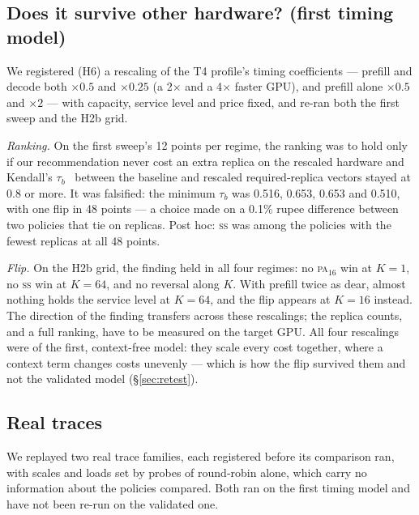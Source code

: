 \documentclass[10pt,twocolumn]{article}
\newcommand{\PA}{\textsc{pa}}
\newcommand{\SSt}{\textsc{ss}}
\begin{document}
\subsection{Does it survive other hardware? (first timing model)}\label{sec:hardware}

We registered (H6) a rescaling of the T4 profile's timing coefficients --- prefill and decode both
$\times 0.5$ and $\times 0.25$ (a 2$\times$ and a 4$\times$ faster GPU), and prefill alone $\times 0.5$
and $\times 2$ --- with capacity, service level and price fixed, and re-ran both the first sweep and
the H2b grid.

\emph{Ranking.} On the first sweep's 12 points per regime, the ranking was to hold only if our
recommendation never cost an extra replica on the rescaled hardware and Kendall's
$\tau_b$~\cite{kendall1945} between the baseline and rescaled required-replica vectors stayed at 0.8
or more. It was falsified: the minimum $\tau_b$ was 0.516, 0.653, 0.653 and 0.510, with one flip in
48 points --- a choice made on a 0.1\% rupee difference between two policies that tie on replicas.
Post hoc: \SSt{} was among the policies with the fewest replicas at all 48 points.

\emph{Flip.} On the H2b grid, the finding held in all four regimes: no \PA$_{16}$ win at $K = 1$, no
\SSt{} win at $K = 64$, and no reversal along $K$. With prefill twice as dear, almost nothing holds
the service level at $K = 64$, and the flip appears at $K = 16$ instead. The direction of the finding
transfers across these rescalings; the replica counts, and a full ranking, have to be measured on the
target GPU. All four rescalings were of the first, context-free model: they scale every cost
together, where a context term changes costs unevenly --- which is how the flip survived them and not
the validated model (\S\ref{sec:retest}).

\subsection{Real traces}\label{sec:real}

We replayed two real trace families, each registered before its comparison ran, with scales and
loads set by probes of round-robin alone, which carry no information about the policies compared.
Both ran on the first timing model and have not been re-run on the validated one.
\end{document}
